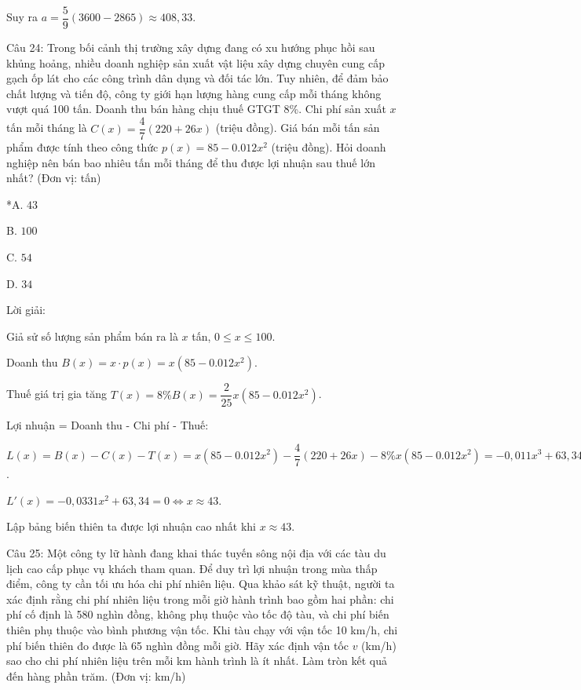 \documentclass[a4paper,12pt]{article}
\begin{document}
Suy ra \(a = \dfrac{5}{9}(3600 - 2865) \approx 408,33\).




Câu 24: Trong bối cảnh thị trường xây dựng đang có xu hướng phục hồi sau khủng hoảng, nhiều doanh nghiệp sản xuất vật liệu xây dựng chuyên cung cấp gạch ốp lát cho các công trình dân dụng và đối tác lớn. Tuy nhiên, để đảm bảo chất lượng và tiến độ, công ty giới hạn lượng hàng cung cấp mỗi tháng không vượt quá 100 tấn. Doanh thu bán hàng chịu thuế GTGT 8\%. Chi phí sản xuất \(x\) tấn mỗi tháng là \(C(x) = \dfrac{4}{7}(220 + 26x)\) (triệu đồng). Giá bán mỗi tấn sản phẩm được tính theo công thức \(p(x) = 85 - 0.012x^2\) (triệu đồng). Hỏi doanh nghiệp nên bán bao nhiêu tấn mỗi tháng để thu được lợi nhuận sau thuế lớn nhất? (Đơn vị: tấn)

*A. \(43\)

B. \(100\)

C. \(54\)

D. \(34\)

Lời giải:


Giả sử số lượng sản phẩm bán ra là \(x\) tấn, \(0 \leq x \leq 100\).

Doanh thu \(B(x) = x \cdot p(x) = x(85 - 0.012x^2)\).

Thuế giá trị gia tăng \(T(x) = 8\% B(x) = \dfrac{2}{25} x(85 - 0.012x^2)\).

Lợi nhuận = Doanh thu - Chi phí - Thuế:

\(L(x) = B(x) - C(x) - T(x) = x(85 - 0.012x^2) - \dfrac{4}{7}(220 + 26x) - 8\% x(85 - 0.012x^2) = -0,011x^3 + 63,34x + -125,71\).

\(L'(x) = -0,0331x^2 + 63,34 = 0 \Leftrightarrow x \approx 43\).

Lập bảng biến thiên ta được lợi nhuận cao nhất khi \(x \approx 43\).




Câu 25: Một công ty lữ hành đang khai thác tuyến sông nội địa với các tàu du lịch cao cấp phục vụ khách tham quan. Để duy trì lợi nhuận trong mùa thấp điểm, công ty cần tối ưu hóa chi phí nhiên liệu. Qua khảo sát kỹ thuật, người ta xác định rằng chi phí nhiên liệu trong mỗi giờ hành trình bao gồm hai phần: chi phí cố định là 580 nghìn đồng, không phụ thuộc vào tốc độ tàu, và chi phí biến thiên phụ thuộc vào bình phương vận tốc. Khi tàu chạy với vận tốc 10 km/h, chi phí biến thiên đo được là 65 nghìn đồng mỗi giờ. Hãy xác định vận tốc \(v\) (km/h) sao cho chi phí nhiên liệu trên mỗi km hành trình là ít nhất. Làm tròn kết quả đến hàng phần trăm. (Đơn vị: km/h)
\end{document}
